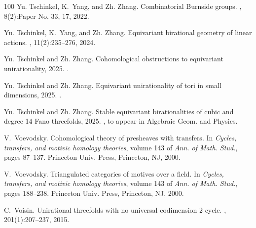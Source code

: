 \documentclass[12pt,reqno]{amsart}
\theoremstyle{plain}
\theoremstyle{remark}
\theoremstyle{definition}
\numberwithin{equation}{section}
\begin{document}
\begin{thebibliography}{100}
Yu. Tschinkel, K.~Yang, and Zh. Zhang.
\newblock Combinatorial {B}urnside groups.
, 8(2):Paper No. 33, 17, 2022.

Yu. Tschinkel, K.~Yang, and Zh. Zhang.
\newblock Equivariant birational geometry of linear actions.
, 11(2):235--276, 2024.

Yu. Tschinkel and Zh. Zhang.
\newblock Cohomological obstructions to equivariant unirationality, 2025.
.

Yu. Tschinkel and Zh. Zhang.
\newblock Equivariant unirationality of tori in small dimensions, 2025.
.

Yu. Tschinkel and Zh. Zhang.
\newblock Stable equivariant birationalities of cubic and degree 14 {F}ano
  threefolds, 2025.
, to appear in Algebraic Geom. and Physics.

V.~Voevodsky.
\newblock Cohomological theory of presheaves with transfers.
\newblock In {\em Cycles, transfers, and motivic homology theories}, volume 143
  of {\em Ann. of Math. Stud.}, pages 87--137. Princeton Univ. Press,
  Princeton, NJ, 2000.

V.~Voevodsky.
\newblock Triangulated categories of motives over a field.
\newblock In {\em Cycles, transfers, and motivic homology theories}, volume 143
  of {\em Ann. of Math. Stud.}, pages 188--238. Princeton Univ. Press,
  Princeton, NJ, 2000.

C.~Voisin.
\newblock Unirational threefolds with no universal codimension {$2$} cycle.
, 201(1):207--237, 2015.

\end{thebibliography}
\end{document}
